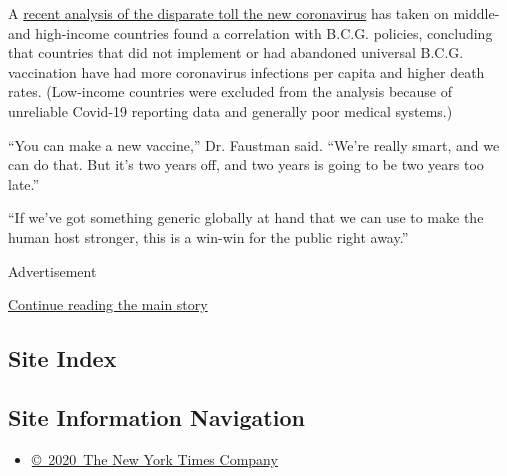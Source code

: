 A
\href{https://www.medrxiv.org/content/10.1101/2020.03.24.20042937v1}{recent
analysis of the disparate toll the new coronavirus} has taken on middle-
and high-income countries found a correlation with B.C.G. policies,
concluding that countries that did not implement or had abandoned
universal B.C.G. vaccination have had more coronavirus infections per
capita and higher death rates. (Low-income countries were excluded from
the analysis because of unreliable Covid-19 reporting data and generally
poor medical systems.)

``You can make a new vaccine,'' Dr. Faustman said. ``We're really smart,
and we can do that. But it's two years off, and two years is going to be
two years too late.''

``If we've got something generic globally at hand that we can use to
make the human host stronger, this is a win-win for the public right
away.''

Advertisement

\protect\hyperlink{after-bottom}{Continue reading the main story}

\hypertarget{site-index}{%
\subsection{Site Index}\label{site-index}}

\hypertarget{site-information-navigation}{%
\subsection{Site Information
Navigation}\label{site-information-navigation}}

\begin{itemize}
\tightlist
\item
  \href{https://help.nytimes3xbfgragh.onion/hc/en-us/articles/115014792127-Copyright-notice}{©~2020~The
  New York Times Company}
\end{itemize}

